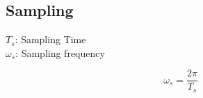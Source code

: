 \subsection{Sampling}
    \begin{minipage}{0.49\linewidth}
        \centering \vspace{4pt}
        $T_s$: Sampling Time\\
        \vspace{2pt}
        $\omega_s$: Sampling frequency\\      
    \end{minipage}
    \begin{minipage}{0.49\linewidth}
        \centering
        $$
            \omega_s = \frac{2\pi}{T_s}
        $$
    \end{minipage}